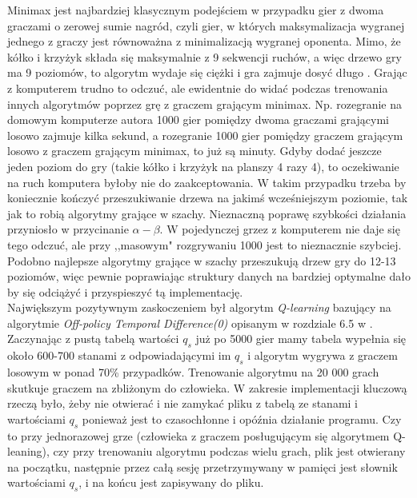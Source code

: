\documentclass[licencjacka]{pracamgr}
\begin{document}
Minimax jest najbardziej klasycznym podejściem w przypadku gier z dwoma graczami o zerowej sumie nagród,  czyli gier, w których maksymalizacja wygranej jednego z graczy jest równoważna z minimalizacją wygranej oponenta.   Mimo, że kółko i krzyżyk składa się maksymalnie z 9 sekwencji ruchów, a więc drzewo gry ma 9 poziomów, to algorytm wydaje się ciężki i gra zajmuje dosyć długo . Grając z komputerem trudno to odczuć, ale ewidentnie do widać podczas trenowania innych algorytmów poprzez grę z graczem grającym minimax. Np. rozegranie na domowym komputerze autora 1000 gier pomiędzy dwoma graczami grającymi losowo zajmuje kilka sekund, a rozegranie 1000 gier pomiędzy graczem grającym losowo z graczem grającym minimax, to już są minuty. Gdyby dodać jeszcze jeden poziom do gry (takie kółko i krzyżyk na planszy 4 razy 4), to oczekiwanie na ruch komputera byłoby nie do zaakceptowania. W takim przypadku trzeba by koniecznie kończyć przeszukiwanie drzewa na jakimś wcześniejszym poziomie, tak jak to robią algorytmy grające w szachy.  Nieznaczną poprawę szybkości działania przyniosło w przycinanie $\alpha-\beta$. W pojedynczej grzez z komputerem nie daje się tego odczuć, ale przy ,,masowym" rozgrywaniu 1000 jest to nieznacznie szybciej. Podobno najlepsze algorytmy grające w szachy przeszukują drzew gry do 12-13 poziomów, więc pewnie poprawiając struktury danych na bardziej optymalne dało by się odciążyć i przyspieszyć tą implementację.\\

Największym pozytywnym zaskoczeniem był algorytm  \textit{Q-learning} bazujący na algorytmie \textit{Off-policy Temporal Difference(0)} opisanym w rozdziale 6.5 w \cite{RL}. Zaczynając z pustą tabelą wartości $q_{s}$ już po 5000 gier mamy tabela wypełnia się około 600-700 stanami z odpowiadającymi im $q_{s}$ i algorytm wygrywa z graczem losowym w ponad 70\% przypadków. Trenowanie algorytmu na 20 000 grach skutkuje graczem na zbliżonym do człowieka. W zakresie implementacji kluczową rzeczą było, żeby nie otwierać i nie zamykać pliku z  tabelą  ze stanami i wartościami $q_{s}$ ponieważ jest to czasochłonne i opóźnia działanie programu. Czy to przy  jednorazowej grze (człowieka z graczem posługującym się algorytmem Q-leaning), czy przy trenowaniu algorytmu podczas wielu grach,  plik jest otwierany na początku, następnie przez całą sesję przetrzymywany w pamięci jest słownik wartościami $q_{s}$, i na końcu jest zapisywany do pliku.\\ 
\end{document}
